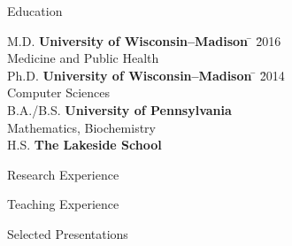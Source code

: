 \documentclass{resume2} %
\begin{document}

\begin{rSection}{Education}

\begin{tabbing}
M.D.  \hspace*{2.32 em}\= \textbf{University of Wisconsin--Madison} \hspace*{5em} \= \hspace*{15em} \= 2016\\
\> Medicine and Public Health \\
Ph.D. \hspace*{2 em}\= \textbf{University of Wisconsin--Madison} \hspace*{5em} \= \hspace*{15em} \= 2014\\
\> Computer Sciences \\
%
B.A./B.S. \hspace*{2 em}\> \textbf{University of Pennsylvania} \>  \\
\> Mathematics, Biochemistry \\
%
H.S.\hspace*{2 em}\> \textbf{The Lakeside School} \>  \\
\end{tabbing}
\end{rSection}

\begin{rSection}{Research Experience}
%
\end{rSection}

\begin{rSection}{Teaching Experience}
%
\end{rSection}

\begin{rSection}{Selected Presentations}
%
\end{rSection}
\end{document}
